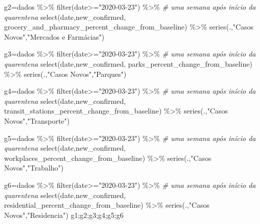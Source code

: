 \documentclass[
]{book}
\newenvironment{Shaded}{\begin{snugshade}}{\end{snugshade}}
\newcommand{\CommentTok}[1]{\textcolor[rgb]{0.56,0.35,0.01}{\textit{#1}}}
\newcommand{\FunctionTok}[1]{\textcolor[rgb]{0.00,0.00,0.00}{#1}}
\newcommand{\NormalTok}[1]{#1}
\newcommand{\OtherTok}[1]{\textcolor[rgb]{0.56,0.35,0.01}{#1}}
\newcommand{\SpecialCharTok}[1]{\textcolor[rgb]{0.00,0.00,0.00}{#1}}
\newcommand{\StringTok}[1]{\textcolor[rgb]{0.31,0.60,0.02}{#1}}
\begin{document}
\begin{Shaded}
\begin{Highlighting}[]
\NormalTok{g2}\OtherTok{=}\NormalTok{dados }\SpecialCharTok{\%\textgreater{}\%} 
  \FunctionTok{filter}\NormalTok{(date}\SpecialCharTok{\textgreater{}=}\StringTok{"2020{-}03{-}23"}\NormalTok{) }\SpecialCharTok{\%\textgreater{}\%} \CommentTok{\# uma semana após início da quarentena}
  \FunctionTok{select}\NormalTok{(date,new\_confirmed,}
\NormalTok{      grocery\_and\_pharmacy\_percent\_change\_from\_baseline) }\SpecialCharTok{\%\textgreater{}\%} 
  \FunctionTok{series}\NormalTok{(.,}\StringTok{"Casos Novos"}\NormalTok{,}\StringTok{"Mercados e Farmácias"}\NormalTok{)}

\NormalTok{g3}\OtherTok{=}\NormalTok{dados }\SpecialCharTok{\%\textgreater{}\%} 
  \FunctionTok{filter}\NormalTok{(date}\SpecialCharTok{\textgreater{}=}\StringTok{"2020{-}03{-}23"}\NormalTok{) }\SpecialCharTok{\%\textgreater{}\%} \CommentTok{\# uma semana após início da quarentena}
  \FunctionTok{select}\NormalTok{(date,new\_confirmed,}
\NormalTok{      parks\_percent\_change\_from\_baseline) }\SpecialCharTok{\%\textgreater{}\%} 
  \FunctionTok{series}\NormalTok{(.,}\StringTok{"Casos Novos"}\NormalTok{,}\StringTok{"Parques"}\NormalTok{)}

\NormalTok{g4}\OtherTok{=}\NormalTok{dados }\SpecialCharTok{\%\textgreater{}\%} 
  \FunctionTok{filter}\NormalTok{(date}\SpecialCharTok{\textgreater{}=}\StringTok{"2020{-}03{-}23"}\NormalTok{) }\SpecialCharTok{\%\textgreater{}\%} \CommentTok{\# uma semana após início da quarentena}
  \FunctionTok{select}\NormalTok{(date,new\_confirmed,}
\NormalTok{      transit\_stations\_percent\_change\_from\_baseline) }\SpecialCharTok{\%\textgreater{}\%} 
  \FunctionTok{series}\NormalTok{(.,}\StringTok{"Casos Novos"}\NormalTok{,}\StringTok{"Transporte"}\NormalTok{)}

\NormalTok{g5}\OtherTok{=}\NormalTok{dados }\SpecialCharTok{\%\textgreater{}\%} 
  \FunctionTok{filter}\NormalTok{(date}\SpecialCharTok{\textgreater{}=}\StringTok{"2020{-}03{-}23"}\NormalTok{) }\SpecialCharTok{\%\textgreater{}\%} \CommentTok{\# uma semana após início da quarentena}
  \FunctionTok{select}\NormalTok{(date,new\_confirmed,}
\NormalTok{      workplaces\_percent\_change\_from\_baseline) }\SpecialCharTok{\%\textgreater{}\%} 
  \FunctionTok{series}\NormalTok{(.,}\StringTok{"Casos Novos"}\NormalTok{,}\StringTok{"Trabalho"}\NormalTok{)}

\NormalTok{g6}\OtherTok{=}\NormalTok{dados }\SpecialCharTok{\%\textgreater{}\%} 
  \FunctionTok{filter}\NormalTok{(date}\SpecialCharTok{\textgreater{}=}\StringTok{"2020{-}03{-}23"}\NormalTok{) }\SpecialCharTok{\%\textgreater{}\%} \CommentTok{\# uma semana após início da quarentena}
  \FunctionTok{select}\NormalTok{(date,new\_confirmed,}
\NormalTok{      residential\_percent\_change\_from\_baseline) }\SpecialCharTok{\%\textgreater{}\%} 
  \FunctionTok{series}\NormalTok{(.,}\StringTok{"Casos Novos"}\NormalTok{,}\StringTok{"Residencia"}\NormalTok{)}
\NormalTok{g1;g2;g3;g4;g5;g6}
\end{Highlighting}
\end{Shaded}
\end{document}
